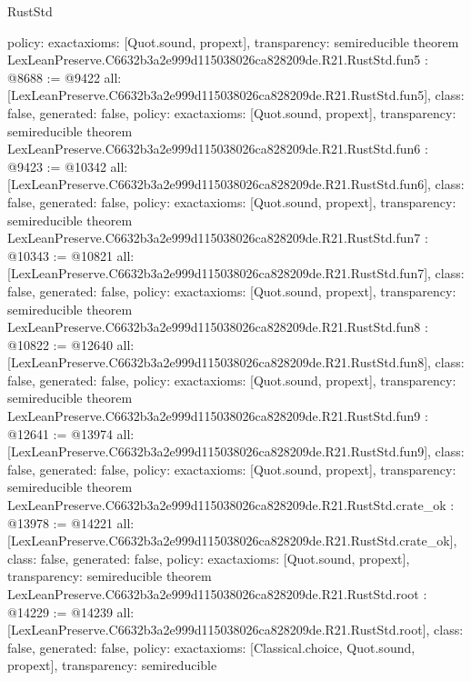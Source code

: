 \begin{lexlean}{RustStd}
\begin{coremodule}
{  policy: exact{axioms: [Quot.sound, propext]},
  transparency: semireducible
}
theorem LexLeanPreserve.C6632b3a2e999d115038026ca828209de.R21.RustStd.fun5 : @8688 := @9422 {
  all: [LexLeanPreserve.C6632b3a2e999d115038026ca828209de.R21.RustStd.fun5],
  class: false,
  generated: false,
  policy: exact{axioms: [Quot.sound, propext]},
  transparency: semireducible
}
theorem LexLeanPreserve.C6632b3a2e999d115038026ca828209de.R21.RustStd.fun6 : @9423 := @10342 {
  all: [LexLeanPreserve.C6632b3a2e999d115038026ca828209de.R21.RustStd.fun6],
  class: false,
  generated: false,
  policy: exact{axioms: [Quot.sound, propext]},
  transparency: semireducible
}
theorem LexLeanPreserve.C6632b3a2e999d115038026ca828209de.R21.RustStd.fun7 : @10343 := @10821 {
  all: [LexLeanPreserve.C6632b3a2e999d115038026ca828209de.R21.RustStd.fun7],
  class: false,
  generated: false,
  policy: exact{axioms: [Quot.sound, propext]},
  transparency: semireducible
}
theorem LexLeanPreserve.C6632b3a2e999d115038026ca828209de.R21.RustStd.fun8 : @10822 := @12640 {
  all: [LexLeanPreserve.C6632b3a2e999d115038026ca828209de.R21.RustStd.fun8],
  class: false,
  generated: false,
  policy: exact{axioms: [Quot.sound, propext]},
  transparency: semireducible
}
theorem LexLeanPreserve.C6632b3a2e999d115038026ca828209de.R21.RustStd.fun9 : @12641 := @13974 {
  all: [LexLeanPreserve.C6632b3a2e999d115038026ca828209de.R21.RustStd.fun9],
  class: false,
  generated: false,
  policy: exact{axioms: [Quot.sound, propext]},
  transparency: semireducible
}
theorem LexLeanPreserve.C6632b3a2e999d115038026ca828209de.R21.RustStd.crate_ok : @13978 := @14221 {
  all: [LexLeanPreserve.C6632b3a2e999d115038026ca828209de.R21.RustStd.crate_ok],
  class: false,
  generated: false,
  policy: exact{axioms: [Quot.sound, propext]},
  transparency: semireducible
}
theorem LexLeanPreserve.C6632b3a2e999d115038026ca828209de.R21.RustStd.root : @14229 := @14239 {
  all: [LexLeanPreserve.C6632b3a2e999d115038026ca828209de.R21.RustStd.root],
  class: false,
  generated: false,
  policy: exact{axioms: [Classical.choice, Quot.sound, propext]},
  transparency: semireducible
}


\end{coremodule}
\end{lexlean}
